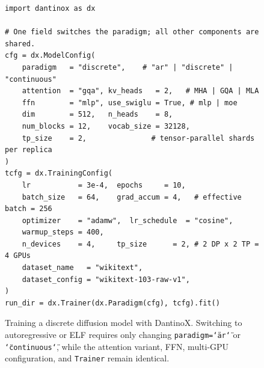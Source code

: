 


\begin{figure}[t]
\begin{lstlisting}[style=dxpy]
import dantinox as dx

# One field switches the paradigm; all other components are shared.
cfg = dx.ModelConfig(
    paradigm   = "discrete",    # "ar" | "discrete" | "continuous"
    attention  = "gqa", kv_heads   = 2,   # MHA | GQA | MLA
    ffn        = "mlp", use_swiglu = True, # mlp | moe
    dim        = 512,   n_heads    = 8,
    num_blocks = 12,    vocab_size = 32128,
    tp_size    = 2,               # tensor-parallel shards per replica
)
tcfg = dx.TrainingConfig(
    lr           = 3e-4,  epochs     = 10,
    batch_size   = 64,    grad_accum = 4,   # effective batch = 256
    optimizer    = "adamw",  lr_schedule  = "cosine",
    warmup_steps = 400,
    n_devices    = 4,     tp_size      = 2, # 2 DP x 2 TP = 4 GPUs
    dataset_name   = "wikitext",
    dataset_config = "wikitext-103-raw-v1",
)
run_dir = dx.Trainer(dx.Paradigm(cfg), tcfg).fit()
\end{lstlisting}
\caption{Training a discrete diffusion model with DantinoX. Switching to
  autoregressive or ELF requires only changing \texttt{paradigm=\char`\"ar\char`\"}
  or \texttt{\char`\"continuous\char`\"}, while the attention variant, FFN,
  multi-GPU configuration, and \texttt{Trainer} remain identical.}
\label{lst:training}
\end{figure}

